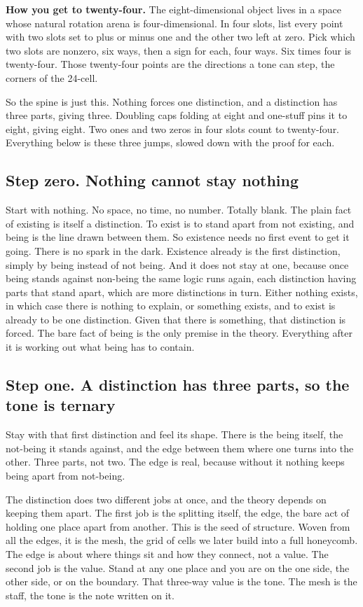 \textbf{How you get to twenty-four.} The eight-dimensional object lives in a space whose natural rotation arena is four-dimensional. In four slots, list every point with two slots set to plus or minus one and the other two left at zero. Pick which two slots are nonzero, six ways, then a sign for each, four ways. Six times four is twenty-four. Those twenty-four points are the directions a tone can step, the corners of the 24-cell.

So the spine is just this. Nothing forces one distinction, and a distinction has three parts, giving three. Doubling caps folding at eight and one-stuff pins it to eight, giving eight. Two ones and two zeros in four slots count to twenty-four. Everything below is these three jumps, slowed down with the proof for each.

\subsection*{Step zero. Nothing cannot stay nothing}

Start with nothing. No space, no time, no number. Totally blank. The plain fact of existing is itself a distinction. To exist is to stand apart from not existing, and being is the line drawn between them. So existence needs no first event to get it going. There is no spark in the dark. Existence already is the first distinction, simply by being instead of not being. And it does not stay at one, because once being stands against non-being the same logic runs again, each distinction having parts that stand apart, which are more distinctions in turn. Either nothing exists, in which case there is nothing to explain, or something exists, and to exist is already to be one distinction. Given that there is something, that distinction is forced. The bare fact of being is the only premise in the theory. Everything after it is working out what being has to contain.

\subsection*{Step one. A distinction has three parts, so the tone is ternary}

Stay with that first distinction and feel its shape. There is the being itself, the not-being it stands against, and the edge between them where one turns into the other. Three parts, not two. The edge is real, because without it nothing keeps being apart from not-being.

The distinction does two different jobs at once, and the theory depends on keeping them apart. The first job is the splitting itself, the edge, the bare act of holding one place apart from another. This is the seed of structure. Woven from all the edges, it is the mesh, the grid of cells we later build into a full honeycomb. The edge is about where things sit and how they connect, not a value. The second job is the value. Stand at any one place and you are on the one side, the other side, or on the boundary. That three-way value is the tone. The mesh is the staff, the tone is the note written on it.

